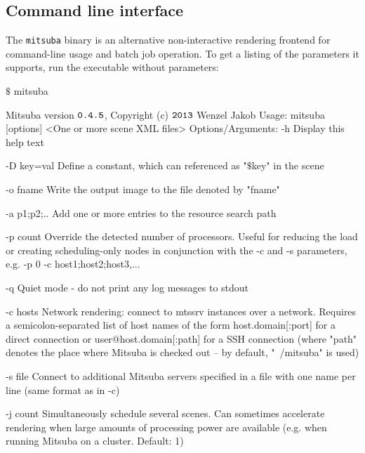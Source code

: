 \subsection{Command line interface}
\label{sec:mitsuba}
The \texttt{mitsuba} binary is an alternative non-interactive rendering
frontend for command-line usage and batch job operation.
To get a listing of the parameters it supports, run
the executable without parameters:
\begin{shell}
$\texttt{\$}$ mitsuba
\end{shell}
\begin{console}[label=lst:mitsuba-cli,caption=Command line options of the \texttt{mitsuba} binary]
Mitsuba version $\texttt{0.4.5}$, Copyright (c) $\texttt{2013}$ Wenzel Jakob
Usage: mitsuba [options] <One or more scene XML files>
Options/Arguments:
   -h          Display this help text

   -D key=val  Define a constant, which can referenced as "$\$$key" in the scene

   -o fname    Write the output image to the file denoted by "fname"

   -a p1;p2;.. Add one or more entries to the resource search path

   -p count    Override the detected number of processors. Useful for reducing
               the load or creating scheduling-only nodes in conjunction with
               the -c and -s parameters, e.g. -p 0 -c host1;host2;host3,...

   -q          Quiet mode - do not print any log messages to stdout

   -c hosts    Network rendering: connect to mtssrv instances over a network.
               Requires a semicolon-separated list of host names of the form
                       host.domain[:port] for a direct connection
                 or
                       user@host.domain[:path] for a SSH connection (where
                       "path" denotes the place where Mitsuba is checked
                       out -- by default, "~/mitsuba" is used)

   -s file     Connect to additional Mitsuba servers specified in a file
               with one name per line (same format as in -c)

   -j count    Simultaneously schedule several scenes. Can sometimes accelerate
               rendering when large amounts of processing power are available
               (e.g. when running Mitsuba on a cluster. Default: 1)


\end{console}
